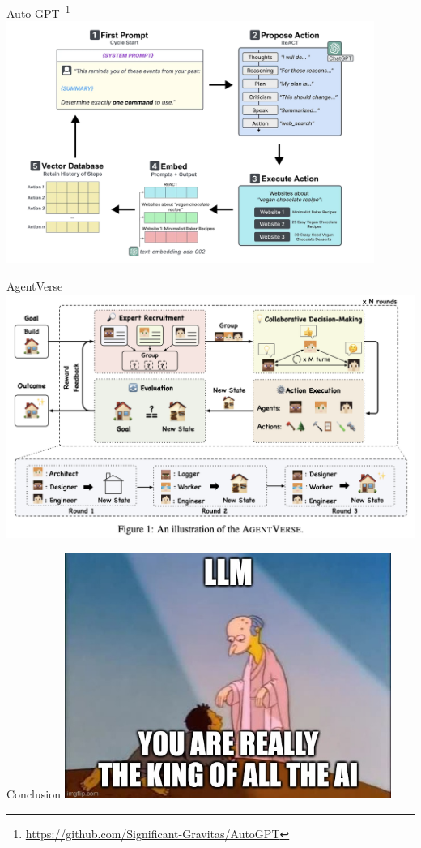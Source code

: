 \documentclass[presentation, 10pt]{beamer}\mode<presentation>{\usetheme{AMSBolognaFC}}
\begin{document}
\begin{frame}{Auto GPT~\footnote{\url{https://github.com/Significant-Gravitas/AutoGPT}}}
	\centering
\includegraphics[width=0.9\textwidth]{img/auto-gpt-loop.png}
\end{frame}
\begin{frame}{AgentVerse~\cite{chen2023agentverse}}
\includegraphics[width=\textwidth]{img/agent-verse.png}
\end{frame}
\begin{frame}{Conclusion}
	\centering
\includegraphics[width=0.8\textwidth]{img/king-of-all-the-king.png}
\end{frame}
\end{document}
